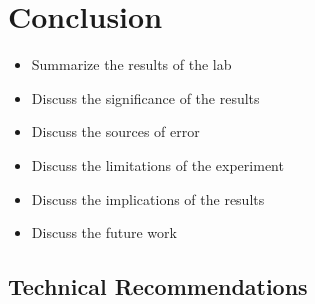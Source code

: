 \section{Conclusion}
\begin{itemize}
    \item Summarize the results of the lab
    \item Discuss the significance of the results
    \item Discuss the sources of error
    \item Discuss the limitations of the experiment
    \item Discuss the implications of the results
    \item Discuss the future work
\end{itemize}
\subsection{Technical Recommendations}


